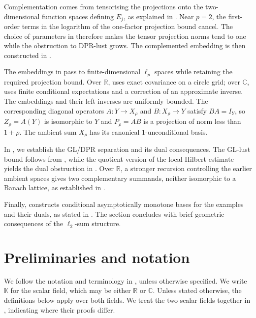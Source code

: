 \documentclass[11pt,a4paper,reqno]{amsart}
\theoremstyle{definition}
\newcommand{\R}{\mathbb R}
\newcommand{\C}{\mathbb C}
\numberwithin{equation}{section}
\begin{document}
Complementation comes from tensorising the projections onto the two-dimensional function spaces defining $E_j$, as explained in . Near $p=2$, the first-order terms in the logarithm of the one-factor projection bound cancel. The choice of parameters in  therefore makes the tensor projection norms tend to one while the obstruction to DPR-lust grows. The complemented embedding is then constructed in .

The embeddings in  pass to finite-dimensional $\ell_p$ spaces while retaining the required projection bound. Over $\R$,  uses exact covariance on a circle grid; over $\C$,  uses finite conditional expectations and a correction of an approximate inverse. The embeddings and their left inverses are uniformly bounded. The corresponding diagonal operators $A\colon Y\to X_\rho$ and $B\colon X_\rho\to Y$ satisfy $BA=I_Y$, so $Z_\rho=A(Y)$ is isomorphic to $Y$ and $P_\rho=AB$ is a projection of norm less than $1+\rho$. The ambient sum $X_\rho$ has its canonical $1$-unconditional basis.

In , we establish the GL/DPR separation and its dual consequences. The GL-lust bound follows from , while the quotient version of the local Hilbert estimate yields the dual obstruction in . Over $\R$, a stronger recursion controlling the earlier ambient spaces gives two complementary summands, neither isomorphic to a Banach lattice, as established in .

Finally,  constructs conditional asymptotically monotone bases for the examples and their duals, as stated in . The section concludes with brief geometric consequences of the $\ell_2$-sum structure.


\section{Preliminaries and notation}\label{sec:preliminaries}

We follow the notation and terminology in \cite{LindenstraussTzafriri1977}, unless otherwise specified. We write $\mathbb K$ for the scalar field, which may be either $\R$ or $\C$. Unless stated otherwise, the definitions below apply over both fields. We treat the two scalar fields together in , indicating where their proofs differ.
\end{document}
